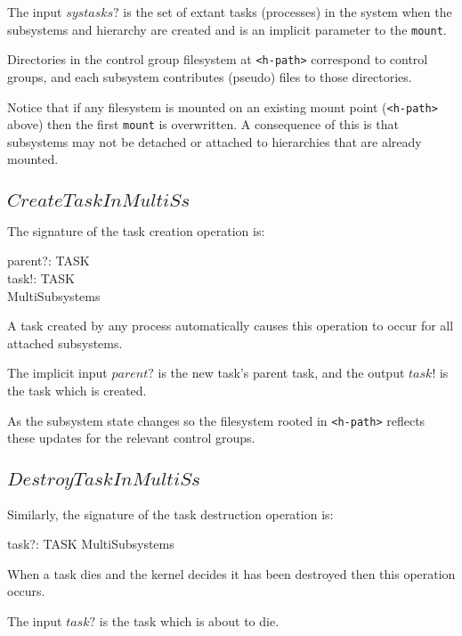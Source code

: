 \documentclass[a4paper,twoside,12pt]{article}
\begin{document}
The input $systasks?$ is the set of extant tasks (processes) in the system when the subsystems and hierarchy
are created and is an implicit parameter to the \texttt{mount}.

Directories in the control group filesystem at \texttt{<h-path>} correspond to control groups, 
and each subsystem contributes
(pseudo) files to those directories.

Notice that if any filesystem is mounted on an existing mount point (\texttt{<h-path>} above) then the first 
\texttt{mount} is overwritten.
A consequence of this is that subsystems may not be detached or attached to hierarchies that are already mounted.

\subsection{$CreateTaskInMultiSs$}

The signature of the task creation operation is:
\begin{schema*}
    parent?: TASK \\
    task!: TASK \\
\also
    \Delta MultiSubsystems
\end{schema*}
A task created by any process automatically causes this operation to occur for all attached subsystems.

The implicit input $parent?$ is the new task's parent task, and the output $task!$ is the task which is created.

As the subsystem state changes so the
filesystem rooted in \texttt{<h-path>} reflects these updates for the relevant control groups.

\subsection{$DestroyTaskInMultiSs$}

Similarly, the signature of the task destruction operation is:
\begin{schema*}
    task?: TASK
\also 
    \Delta MultiSubsystems
\end{schema*}
When a task dies and the kernel decides it has been destroyed then this operation occurs.

The input $task?$ is the task which is about to die.
\end{document}
